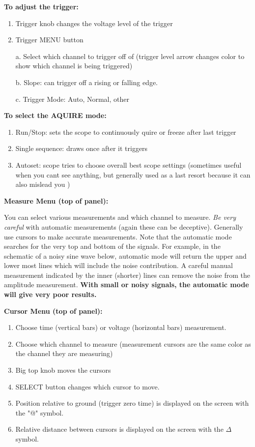 \documentclass[10pt]{PhysLab1C} %
\begin{document}
\textbf{To adjust the trigger:}

\begin{enumerate}
\def\labelenumi{\arabic{enumi}.}
\item
  Trigger knob changes the voltage level of the trigger
\item
  Trigger MENU button

  a. Select which channel to trigger off of (trigger level arrow changes
  color to show which channel is being triggered)

  b. Slope: can trigger off a rising or falling edge.

  c. Trigger Mode: Auto, Normal, other
\end{enumerate}

\textbf{To select the AQUIRE mode:}

\begin{enumerate}
\def\labelenumi{\arabic{enumi}.}
\item
  Run/Stop: sets the scope to continuously quire or freeze after last
  trigger
\item
  Single sequence: draws once after it triggers
\item
  Autoset: scope tries to choose overall best scope settings (sometimes
  useful when you can\textquotesingle t see anything, but generally used
  as a last resort because it can also mislead you )
\end{enumerate}

\textbf{Measure Menu (top of panel):}

You can select various measurements and which channel to measure.
\emph{Be very careful} with automatic measurements (again these can be
deceptive). Generally use cursors to make accurate measurements. Note
that the automatic mode searches for the very top and bottom of the
signals. For example, in the schematic of a noisy sine wave below,
automatic mode will return the upper and lower most lines which will
include the noise contribution. A careful manual measurement indicated
by the inner (shorter) lines can remove the noise from the amplitude
measurement. \textbf{With small or noisy signals, the automatic mode
will give very poor results.}


\textbf{Cursor Menu (top of panel):}

\begin{enumerate}
\def\labelenumi{\arabic{enumi}.}
\item
  Choose time (vertical bars) or voltage (horizontal bars) measurement.
\item
  Choose which channel to measure (measurement cursors are the same
  color as the channel they are measuring)
\item
  Big top knob moves the cursors
\item
  SELECT button changes which cursor to move.
\item
  Position relative to ground (trigger zero time) is displayed on the
  screen with the "@" symbol.
\item
  Relative distance between cursors is displayed on the screen with the $\Delta$ symbol.
\end{enumerate}
\end{document}

